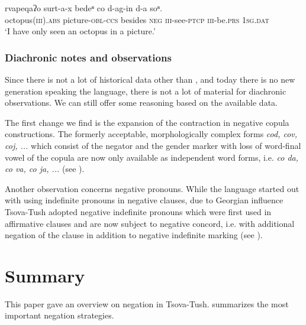 \documentclass[output=paper,%
colorlinks,citecolor=brown,
showindex
]{langscibook}
\begin{document}
\ea	\label{tsova:octopus}
\gll 	rvapeqaʔo surt-a-x bedeⁿ co d-ag-in d-a soⁿ.\\  
	octopus\textsc{(iii).abs} picture-\textsc{obl-ccs} besides \textsc{neg} \textsc{iii}-see-\textsc{ptcp} \textsc{iii}-be.\textsc{prs} \textsc{1sg.dat}\\
\glt `I have only seen an octopus in a picture.' \citep[243]{BertlaniEtAl2013} 
\z

\subsubsection{Diachronic notes and observations}

Since there is not a lot of historical data other than \citet{Schiefner1856}, and today there is no new generation speaking the language, there is not a lot of material for diachronic observations. We can still offer some reasoning based on the available data.

The first change we find is the expansion of the contraction in negative copula constructions. The formerly acceptable, morphologically complex forms \textit{cod, cov, coj, ...} which consist of the negator and the gender marker with loss of word-final vowel of the copula are now only available as independent word forms, i.e. \textit{co da, co va, co ja, ...} (see ). 

Another observation concerns negative pronouns. While the language started out with using indefinite pronouns  in negative clauses, due to Georgian influence Tsova-Tush adopted negative indefinite pronouns which were first used in affirmative clauses and are now subject to negative concord, i.e. with additional negation of the clause in addition to negative indefinite marking (see ). 

\section{Summary}
\label{tsova:summary}
This paper gave an overview on negation in Tsova-Tush.  summarizes the most important negation strategies. 
\end{document}
